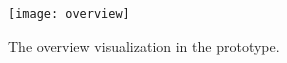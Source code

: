 \begin{figure}[h]
  \texttt{[image: overview]}
  \caption[Overview]{The overview visualization in the prototype.}
  \label{fig:overview}
  \centering
\end{figure}